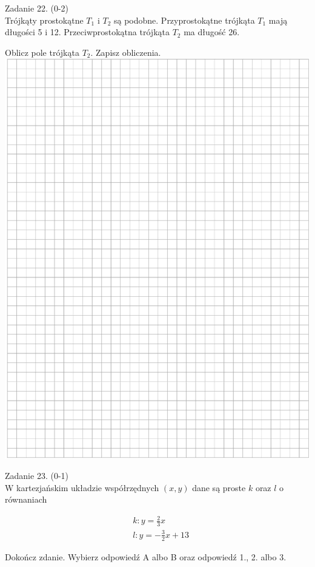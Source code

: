 \documentclass[10pt]{article}
\begin{document}
Zadanie 22. (0-2)\\
Trójkąty prostokątne \(T_{1}\) i \(T_{2}\) są podobne. Przyprostokątne trójkąta \(T_{1}\) mają długości 5 i 12. Przeciwprostokątna trójkąta \(T_{2}\) ma długość 26.

Oblicz pole trójkąta \(T_{2}\). Zapisz obliczenia.\\
\includegraphics[max width=\textwidth, center]{2024_11_21_51cb67544fb9b029f01cg-19}

Zadanie 23. (0-1)\\
W kartezjańskim układzie współrzędnych \((x, y)\) dane są proste \(k\) oraz \(l\) o równaniach

\[
\begin{aligned}
& k: y=\frac{2}{3} x \\
& l: y=-\frac{3}{2} x+13
\end{aligned}
\]

Dokończ zdanie. Wybierz odpowiedź A albo B oraz odpowiedź 1., 2. albo 3.
\end{document}
